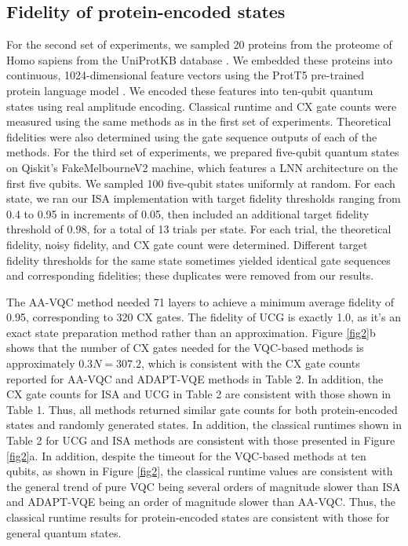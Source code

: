 \subsection{Fidelity of protein-encoded states}
For the second set of experiments, we sampled 20 proteins from the proteome of Homo 
sapiens from the UniProtKB database \cite{consortium2015uniprot}. We embedded these proteins into 
continuous, 1024-dimensional feature vectors using the ProtT5 pre-trained protein 
language model \cite{elnaggar2020prottrans}. We encoded these features into ten-qubit quantum states using 
real amplitude encoding. Classical runtime and CX gate counts were measured using the 
same methods as in the first set of experiments. Theoretical fidelities were also 
determined using the gate sequence outputs of each of the methods. For the third set of experiments, we prepared five-qubit quantum states on Qiskit’s
FakeMelbourneV2 machine, which features a LNN architecture on the first five qubits. 
We sampled 100 five-qubit states uniformly at random. For each state, we ran our ISA 
implementation with target fidelity thresholds ranging from 0.4 to 0.95 in increments 
of 0.05, then included an additional target fidelity threshold of 0.98, for a total 
of 13 trials per state. For each trial, the theoretical fidelity, noisy fidelity, and 
CX gate count were determined. Different target fidelity thresholds for the same 
state sometimes yielded identical gate sequences and corresponding fidelities; these 
duplicates were removed from our results. 

The AA-VQC method needed 71 layers to achieve a minimum average fidelity of 
0.95, corresponding to 320 CX gates. The fidelity of UCG is exactly  1.0, as 
it's an exact state preparation method rather than an approximation. Figure \ref{fig2}b
shows that the number of CX gates needed for the VQC-based methods is 
approximately $0.3N = 307.2$, which is consistent with the CX gate counts
reported for AA-VQC and ADAPT-VQE methods in Table 2. In addition, the CX gate
counts for ISA and UCG in Table 2 are consistent with those shown in Table 1.
Thus, all methods returned similar gate counts for both protein-encoded states
and randomly generated states. In addition, the classical runtimes shown in
Table 2 for UCG and ISA methods are consistent with those presented 
in Figure \ref{fig2}a. In addition, despite the timeout for the VQC-based methods at ten 
qubits, as shown in Figure \ref{fig2}, the classical runtime values are consistent with 
the general trend of pure VQC being several orders of magnitude slower than ISA 
and ADAPT-VQE being an order of magnitude slower than AA-VQC. Thus, the 
classical runtime results for protein-encoded states are consistent with those 
for general quantum states.

